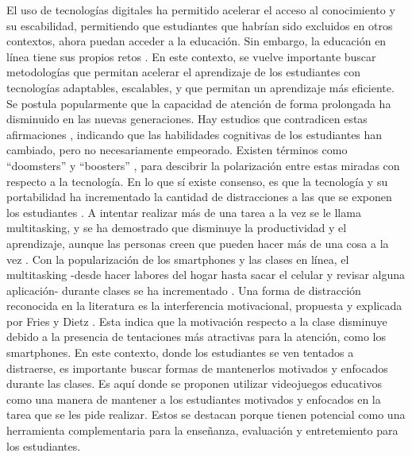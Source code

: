 El uso de tecnologías digitales ha permitido acelerar el acceso al conocimiento y su escabilidad, permitiendo que estudiantes que
habrían sido excluidos en otros contextos, ahora puedan acceder a la educación. Sin embargo, la educación en línea tiene sus propios
retos \cite{UN2023_ImpactDigitalTechnologies}.
En este contexto, se vuelve importante buscar metodologías que permitan acelerar el aprendizaje de los estudiantes con 
tecnologías adaptables, escalables, y que permitan un aprendizaje más eficiente.
Se postula popularmente que la capacidad de atención de forma prolongada ha disminuido en las nuevas generaciones.
Hay estudios que contradicen estas afirmaciones \cite{The_Role_of_Attention_Learning_Digital_Age}, indicando que las
habilidades cognitivas de los estudiantes han cambiado, pero no necesariamente empeorado. Existen términos como ``doomsters'' y ``boosters'' 
\cite{Selwyn2014LookingF}, para descibrir la polarización entre estas miradas con respecto a la tecnología.
En lo que sí existe consenso, es que la tecnología y su portabilidad ha incrementado la cantidad de distracciones a las que se exponen
los estudiantes \cite{Zimmerman2011HandbookOS, Wang2022ComprehensivelySummarizeDistractions}. 
A intentar realizar más de una tarea a la vez se le llama multitasking, y se ha demostrado que disminuye la productividad y el aprendizaje, 
aunque las personas creen que pueden hacer más de una cosa a la vez \cite{Domoff2019AddictivePU}.  Con la popularización de los 
smartphones y las clases en línea, el multitasking -desde hacer labores del hogar hasta sacar el celular y revisar alguna aplicación- durante clases se ha incrementado \cite{Wang2022ComprehensivelySummarizeDistractions}. 
Una forma de distracción reconocida en la literatura es la interferencia motivacional, propuesta y explicada por Fries y Dietz \cite{Fries2007LearningMotivationalInterference}. 
Esta indica que la motivación respecto a la clase disminuye debido a la presencia de tentaciones más atractivas para la atención, como los smartphones. 
En este contexto, donde los estudiantes se ven tentados a distraerse, es importante buscar formas de mantenerlos motivados y enfocados durante las clases. Es aquí donde
se proponen utilizar videojuegos educativos como una manera de mantener a los estudiantes motivados y enfocados en la tarea que se les pide realizar.
Estos se destacan porque tienen potencial como una herramienta complementaria para la enseñanza, evaluación y entretemiento para los estudiantes. 

